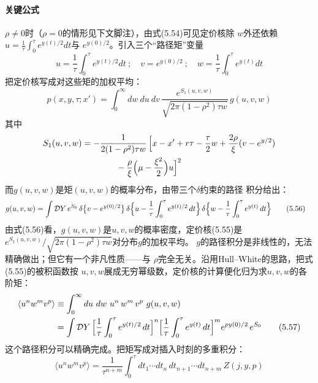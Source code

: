 \paragraph{关键公式}
$\rho\neq0$时（$\rho=0$的情形见下文脚注），由式(5.54)可见定价核除
$w$外还依赖$u=\frac{1}{\tau}\int_{0}^{\tau}e^{y(t)/2}dt$与
$e^{y(0)/2}$。引入三个“路径矩”变量
\begin{equation*}
u=\frac{1}{\tau}\int_{0}^{\tau}e^{y(t)/2}dt\ ;\quad
v=e^{y(0)/2}\ ;\quad
w=\frac{1}{\tau}\int_{0}^{\tau}e^{y(t)}dt
\end{equation*}
把定价核写成对这些矩的加权平均：
\begin{equation*}
p(x,y,\tau;x')=\int_{0}^{\infty}dw\ du\ dv\,
\frac{e^{S_{1}(u,v,w)}}{\sqrt{2\pi(1-\rho^{2})\tau w}}\,g(u,v,w)
\tag{5.55}
\end{equation*}
其中
\begin{align*}
S_{1}(u,v,w)&=-\frac{1}{2(1-\rho^{2})\tau w}\,
\Bigl[x-x'+r\tau-\frac{\tau}{2}w
+\frac{2\rho}{\xi}(v-e^{y/2})\\
&\qquad\qquad-\frac{\rho}{\xi}\Bigl(\mu-\frac{\xi^{2}}{2}\Bigr)u\Bigr]^{2}
\end{align*}
而$g(u,v,w)$是矩$(u,v,w)$的概率分布，由带三个$\delta$约束的路径
积分给出：
\begin{align*}
g(u,v,w)&=\int\mathcal{D}Y\,e^{S_{0}}\,
\delta\bigl\{v-e^{y(0)/2}\bigr\}\,
\delta\Bigl\{u-\frac{1}{\tau}\int_{0}^{\tau}e^{y(t)/2}\,dt\Bigr\}\,
\delta\Bigl\{w-\frac{1}{\tau}\int_{0}^{\tau}e^{y(t)}\,dt\Bigr\}
\tag{5.56}
\end{align*}
由式(5.56)看，$g(u,v,w)$是$u,v,w$的概率密度，定价核(5.55)是
$e^{S_{1}(u,v,w)}/\sqrt{2\pi(1-\rho^{2})\tau w}$对分布$g$的加权平均。
$g$的路径积分是非线性的，无法精确做出；但它有一个非凡性质——与
$\rho$完全无关。沿用Hull--White的思路，把式(5.55)的被积函数按
$u,v,w$展成无穷幂级数，定价核的计算便化归为求$u,v,w$的各阶矩：
\begin{align*}
\langle u^{n}w^{m}v^{p}\rangle
&\equiv\int_{0}^{\infty}du\ dw\ u^{n}\,w^{m}\,v^{p}\ g(u,v,w)\\
&=\int\mathcal{D}Y\,
\Bigl[\frac{1}{\tau}\int_{0}^{\tau}e^{y(t)/2}\,dt\Bigr]^{n}
\Bigl[\frac{1}{\tau}\int_{0}^{\tau}e^{y(t)}\,dt\Bigr]^{m}
e^{py(0)/2}\,e^{S_{0}}
\tag{5.57}
\end{align*}
这个路径积分可以精确完成。把矩写成对插入时刻的多重积分：
\begin{equation*}
\langle u^{n}w^{m}v^{p}\rangle
=\frac{1}{\tau^{n+m}}\int_{0}^{\tau}dt_{1}\cdots dt_{n}\,
dt_{n+1}\cdots dt_{n+m}\,Z(j,y,p)
\tag{5.58}
\end{equation*}
